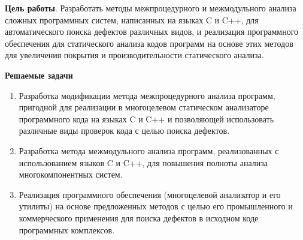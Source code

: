 \documentclass[10pt,gray]{beamer}
\begin{document}
\begin{frame}
\textbf{\Large{Цель работы}}. Разработать методы межпроцедурного и межмодульного анализа сложных программных систем, написанных на языках C и C++, для автоматического поиска дефектов различных видов, и реализация программного обеспечения для статического анализа кодов программ на основе этих методов для увеличения покрытия и производительности статического анализа.

\vspace{5pt}
\textbf{\Large{Решаемые задачи}}

\begin{enumerate}
  \item Разработка модификации метода межпроцедурного анализа программ, пригодной для реализации в многоцелевом статическом анализаторе программного кода на языках C и C++ и позволяющей использовать различные виды проверок кода с целью поиска дефектов.
  \item Разработка метода межмодульного анализа программ, реализованных с использованием языков C и C++, для повышения полноты анализа многокомпонентных систем.
  \item Реализация программного обеспечения (многоцелевой анализатор и его утилиты) на основе предложенных методов с целью его промышленного и коммерческого применения для поиска дефектов в исходном коде программных комплексов.
\end{enumerate}

\end{frame}
\end{document}
